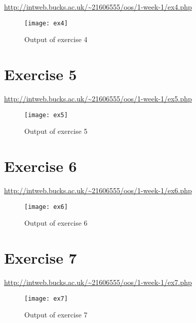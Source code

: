 \url{http://intweb.bucks.ac.uk/~21606555/oos/1-week-1/ex4.php}
\captionsetup{type=figure}


\begin{figure}[H]
  \caption{Output of exercise 4}
  \centering
  \texttt{[image: ex4]}
\end{figure}

\clearpage
\section{Exercise 5}

\url{http://intweb.bucks.ac.uk/~21606555/oos/1-week-1/ex5.php}
\captionsetup{type=figure}


\begin{figure}[H]
  \caption{Output of exercise 5}
  \centering
  \texttt{[image: ex5]}
\end{figure}

\section{Exercise 6}

\url{http://intweb.bucks.ac.uk/~21606555/oos/1-week-1/ex6.php}
\captionsetup{type=figure}


\begin{figure}[H]
  \caption{Output of exercise 6}
  \centering
  \texttt{[image: ex6]}
\end{figure}

\section{Exercise 7}

\url{http://intweb.bucks.ac.uk/~21606555/oos/1-week-1/ex7.php}
\captionsetup{type=figure}


\begin{figure}[H]
  \caption{Output of exercise 7}
  \centering
  \texttt{[image: ex7]}
\end{figure}
